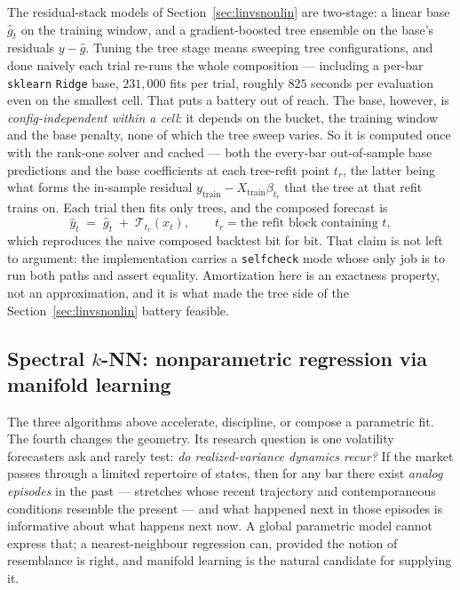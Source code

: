 The residual-stack models of Section~\ref{sec:linvsnonlin} are two-stage: a linear
base $\hat{g}_t$ on the training window, and a gradient-boosted tree ensemble
\citep{Chen2016,Ke2017} on the base's residuals $y - \hat{g}$. Tuning the tree
stage means sweeping tree configurations, and done naively each trial re-runs the
whole composition --- including a per-bar \texttt{sklearn} \texttt{Ridge} base,
$231{,}000$ fits per trial, roughly $825$ seconds per evaluation even on the
smallest cell. That puts a battery out of reach. The base, however, is
\emph{config-independent within a cell}: it depends on the bucket, the training
window and the base penalty, none of which the tree sweep varies. So it is computed
once with the rank-one solver and cached --- both the every-bar out-of-sample base
predictions and the base coefficients at each tree-refit point $t_r$, the latter
being what forms the in-sample residual $y_{\mathrm{train}} -
X_{\mathrm{train}}\beta_{t_r}$ that the tree at that refit trains on. Each trial
then fits only trees, and the composed forecast is
\begin{equation}
\hat{y}_t \;=\; \hat{g}_t \;+\; \mathcal{T}_{t_r}(x_t),
\qquad t_r = \text{the refit block containing } t,
\label{eq:amortized}
\end{equation}
which reproduces the naive composed backtest bit for bit. That claim is not left
to argument: the implementation carries a \texttt{selfcheck} mode whose only job
is to run both paths and assert equality. Amortization here is an exactness
property, not an approximation, and it is what made the tree side of the
Section~\ref{sec:linvsnonlin} battery feasible.

\subsection{Spectral \texorpdfstring{$k$}{k}-NN: nonparametric regression via manifold learning}
\label{sec:alg_spectral}

The three algorithms above accelerate, discipline, or compose a parametric fit. The
fourth changes the geometry. Its research question is one volatility forecasters
ask and rarely test: \emph{do realized-variance dynamics recur?} If the market
passes through a limited repertoire of states, then for any bar there exist
\emph{analog episodes} in the past --- stretches whose recent trajectory and
contemporaneous conditions resemble the present --- and what happened next in those
episodes is informative about what happens next now. A global parametric model
cannot express that; a nearest-neighbour regression can, provided the notion of
resemblance is right, and manifold learning is the natural candidate for supplying
it.

